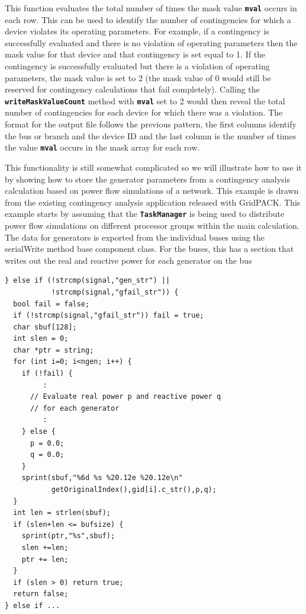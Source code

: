 \documentclass[12pt]{report} %
\begin{document}
This function evaluates the total number of times the mask value \texttt{\textbf{mval}} occurs in each row. This can be used to identify the number of contingencies for which a device violates its operating parameters. For example, if a contingency is successfully evaluated and there is no violation of operating parameters then the mask value for that device and that contingency is set equal to 1. If the contingency is successfully evaluated but there is a violation of operating parameters, the mask value is set to 2 (the mask value of 0 would still be reserved for contingency calculations that fail completely). Calling the \texttt{\textbf{writeMaskValueCount}} method with \texttt{\textbf{mval}} set to 2 would then reveal the total number of contingencies for each device for which there was a violation. The format for the output file follows the previous pattern, the first columns identify the bus or branch and the device ID and the last column is the number of times the value \texttt{\textbf{mval}} occurs in the mask array for each row.

This functionality is still somewhat complicated so we will illustrate how to use it by showing how to store the generator parameters from a contingency analysis calculation based on power flow simulations of a network. This example is drawn from the existing contingency analysis application released with GridPACK. This example starts by assuming that the \texttt{\textbf{TaskManager}} is being used to distribute power flow simulations on different processor groups within the main calculation. The data for generators is exported from the individual buses using the serialWrite method base component class. For the buses, this has a section that writes out the real and reactive power for each generator on the bus

{
\color{red}
\begin{Verbatim}[fontseries=b]
} else if (!strcmp(signal,"gen_str") ||
           !strcmp(signal,"gfail_str")) {
  bool fail = false;
  if (!strcmp(signal,"gfail_str")) fail = true;
  char sbuf[128];
  int slen = 0;  
  char *ptr = string;  
  for (int i=0; i<ngen; i++) {
    if (!fail) {
         :
      // Evaluate real power p and reactive power q
      // for each generator
         :
    } else {
      p = 0.0;
      q = 0.0;
    }
    sprint(sbuf,"%6d %s %20.12e %20.12e\n"
           getOriginalIndex(),gid[i].c_str(),p,q);
  }
  int len = strlen(sbuf);
  if (slen+len <= bufsize) {
    sprint(ptr,"%s",sbuf);
    slen +=len;
    ptr += len;
  }
  if (slen > 0) return true;
  return false;
} else if ...

\end{Verbatim}
}
\end{document}
